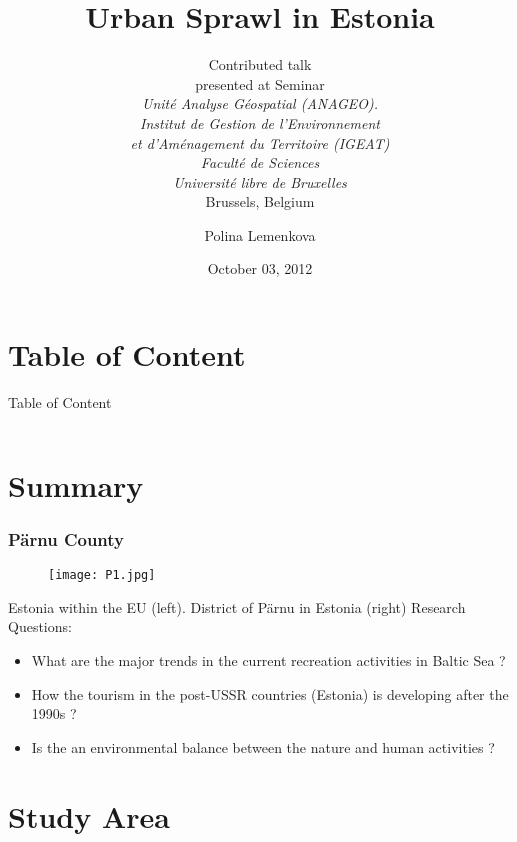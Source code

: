 \documentclass[pdflatex,compress,8pt,
	xcolor={dvipsnames,dvipsnames,svgnames,x11names,table},
	hyperref={	
	breaklinks = true, 
	pdfauthor={Lemenkova Polina}, 
	pdfsubject={Preentation}, 
	pdfcreator={Lemenkova Polina}, 
	pdfproducer={Lemenkova Polina}, 
	colorlinks=true,
	linkcolor=Tomato, 
	citecolor=DeepPink3, 
	urlcolor = NavyBlue, 
	breaklinks = true}]{beamer}
\title[Urban Sprawl in Estonia. Presented at: Universit\'{e} libre de Bruxelles, Belgique. 03/10/2012.]{Urban Sprawl in Estonia}
\subtitle{Contributed talk \\
presented at Seminar\\
\emph{Unit\'{e} Analyse G\'{e}ospatial (ANAGEO).\\
Institut de Gestion de l'Environnement \\
et d'Aménagement du Territoire (IGEAT)\\
Facult\'{e} de Sciences\\
Universit\'{e} libre de Bruxelles}\\
Brussels, Belgium}
\author[Polina Lemenkova]{\large{Polina Lemenkova}}
\date{October 03, 2012}
\begin{document}
	\setcounter{showProgressBar}{0}
	\setcounter{showSlideNumbers}{0}

	\frame{\titlepage}


\section*{Table of Content}
\begin{frame}{Table of Content}
    \begin{columns}[onlytextwidth,T]
        \begin{column}{.5\textwidth}
            \small{\tableofcontents[sections=1-9]}
        \end{column}
        \begin{column}{.5\textwidth}
            \small{\tableofcontents[sections=10-20]}
        \end{column}
    \end{columns}
\end{frame}

\section{Summary}
\begin{frame}\frametitle{Pärnu County}
\begin{figure}[H]
	\centering
		\texttt{[image: P1.jpg]}
\end{figure}
\footnotesize{Estonia within the EU (left). District of Pärnu in Estonia (right)}
Research Questions:
\begin{itemize}
	\item What are the major trends in the current recreation activities in Baltic Sea ?
	\item How the tourism in the post-USSR countries (Estonia) is developing after the 1990s ?
	\item Is the an environmental balance between the nature and human activities ?
\end{itemize}
\end{frame} 

\section{Study Area}
\end{document}

